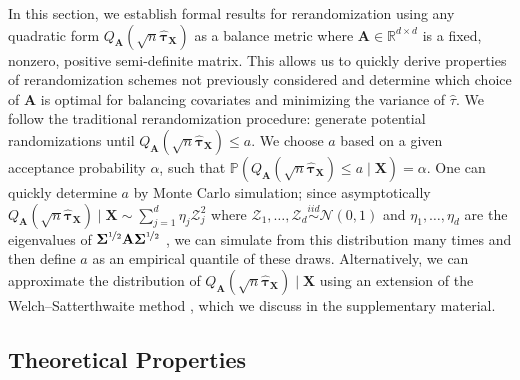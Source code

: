 \documentclass[11pt,twoside]{article}
\theoremstyle{definition}
\theoremstyle{remark}
\begin{document}
In this section, we establish formal results for rerandomization using any quadratic form $Q_{\mathbf{A}}(\sqrt{n} \widehat{\bm{\tau}}_{\mathbf{X}})$ as a balance metric where $\mathbf{A} \in \mathbb{R}^{d \times d}$ is a fixed, nonzero, positive semi-definite matrix. This allows us to quickly derive properties of rerandomization schemes not previously considered and determine which choice of $\mathbf{A}$ is optimal for balancing covariates and minimizing the variance of $\widehat{\tau}$. We follow the traditional rerandomization procedure: generate potential randomizations until $Q_{\mathbf{A}}(\sqrt{n} \widehat{\bm{\tau}}_{\mathbf{X}}) \leq a$. We choose $a$ based on a given acceptance probability $\alpha$, such that $\mathbb{P}(Q_{\mathbf{A}}(\sqrt{n} \widehat{\bm{\tau}}_{\mathbf{X}}) \leq a \mid \mathbf{X}) = \alpha$. One can quickly determine $a$ by Monte Carlo simulation; since asymptotically $Q_{\mathbf{A}}(\sqrt{n} \widehat{\bm{\tau}}_{\mathbf{X}}) \mid \mathbf{X} \sim \sum^d_{j=1} \eta_j \mathcal{Z}^2_j$ where $\mathcal{Z}_1, \ldots, \mathcal{Z}_d \overset{iid}{\sim} \mathcal{N}(0, 1)$ and $\eta_1, \ldots, \eta_d$ are the eigenvalues of $ \mathbf{\Sigma}^{\nicefrac{1}{2}}\mathbf{A} \mathbf{\Sigma}^{\nicefrac{1}{2}}$ \citep{mathai1992quadratic}, we can simulate from this distribution many times and then define $a$ as an empirical quantile of these draws. Alternatively, we can approximate the distribution of $Q_{\mathbf{A}}(\sqrt{n} \widehat{\bm{\tau}}_{\mathbf{X}}) \mid \mathbf{X}$ using an extension of the Welch–Satterthwaite method \citep{stewart2007simple}, which we discuss in the supplementary material. 

\subsection{Theoretical Properties} \label{theoretical_properties_sec}
\end{document}
